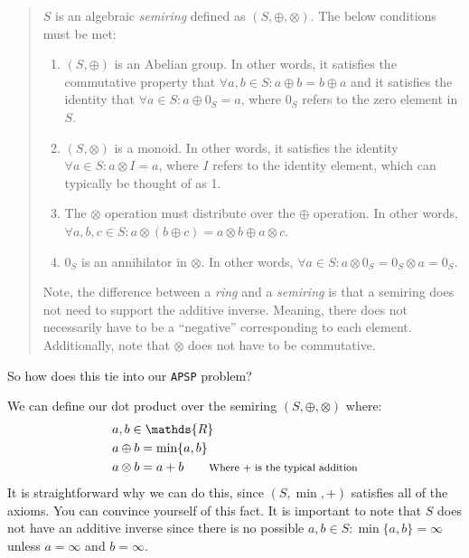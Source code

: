 \documentclass[12pt]{article}
\begin{document}
\begin{quote}
    $S$ is an algebraic \emph{semiring} defined as $(S, \oplus, \otimes)$. The below conditions must be met:

    \begin{enumerate}
        \item $(S, \oplus)$ is an Abelian group. In other words, it satisfies the commutative property that $\forall a, b \in S : a \oplus b = b \oplus a$ and it satisfies the identity that $\forall a \in S : a \oplus 0_S = a$, where $0_S$ refers to the zero element in $S$.
        \item $(S, \otimes)$ is a monoid. In other words, it satisfies the identity $\forall a \in S : a \otimes I = a$, where $I$ refers to the identity element, which can typically be thought of as 1.
        \item The $\otimes$ operation must distribute over the $\oplus$ operation. In other words, $\forall a, b, c \in S : a \otimes (b \oplus c) = a \otimes b \oplus a \otimes c$.
        \item $0_S$ is an annihilator in $\otimes$. In other words, $\forall a \in S : a \otimes 0_S = 0_S \otimes a = 0_S$.
    \end{enumerate}

    {\footnotesize Note, the difference between a \emph{ring} and a \emph{semiring} is that a semiring does not need to support the additive inverse. Meaning, there does not necessarily have to be a ``negative'' corresponding to each element. Additionally, note that $\otimes$ does not have to be commutative.}
\end{quote}

So how does this tie into our \texttt{APSP} problem?

We can define our dot product over the semiring $(S, \oplus, \otimes)$ where:
\[
    \begin{split}
        & a, b \in \mathds{R} \\
        & a \oplus b = \min\{a, b\} \\
        & a \otimes b = a + b \qquad \text{{\footnotesize Where + is the typical addition}}
    \end{split}
\]
It is straightforward why we can do this, since $(S, \min, +)$ satisfies all of the axioms. You can convince yourself of this fact. It is important to note that $S$ does not have an additive inverse since there is no possible $a, b \in S : \min\{a, b\} = \infty$ unless $a = \infty$ and $b = \infty$.
\end{document}
